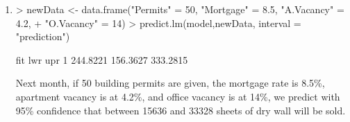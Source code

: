 \documentclass[]{article}
\begin{document}
\begin{enumerate}
\begin{enumerate}
\item

\begin{Schunk}
\begin{Sinput}
> newData <- data.frame("Permits" = 50, "Mortgage" = 8.5, "A.Vacancy" = 4.2, 
+                       "O.Vacancy" = 14)
> predict.lm(model,newData, interval = "prediction")
\end{Sinput}
\begin{Soutput}
       fit      lwr      upr
1 244.8221 156.3627 333.2815
\end{Soutput}
\end{Schunk}

Next month, if 50 building permits are given, the mortgage rate is 8.5\%, apartment vacancy is at 4.2\%, and office vacancy is at 14\%, we predict with 95\% confidence that between 15636 and 33328 sheets of dry wall will be sold.

\end{enumerate}


\end{enumerate}
\end{document}

